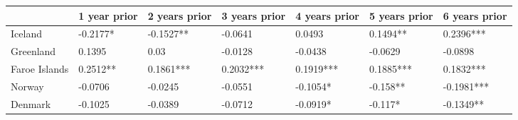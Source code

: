
\begin{tabular}{l|l|l|l|l|l|l}
\hline
  & 1 year prior & 2 years prior & 3 years prior & 4 years prior & 5 years prior & 6 years prior\\
\hline
Iceland & -0.2177* & -0.1527** & -0.0641 & 0.0493 & 0.1494** & 0.2396***\\
\hline
Greenland & 0.1395 & 0.03 & -0.0128 & -0.0438 & -0.0629 & -0.0898\\
\hline
Faroe Islands & 0.2512** & 0.1861*** & 0.2032*** & 0.1919*** & 0.1885*** & 0.1832***\\
\hline
Norway & -0.0706 & -0.0245 & -0.0551 & -0.1054* & -0.158** & -0.1981***\\
\hline
Denmark & -0.1025 & -0.0389 & -0.0712 & -0.0919* & -0.117* & -0.1349**\\
\hline
\end{tabular}
